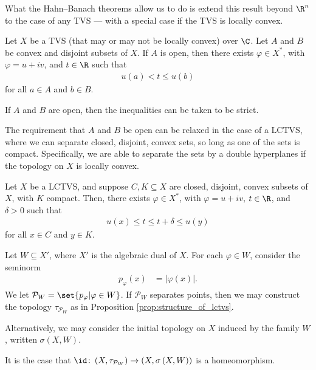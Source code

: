 What the Hahn--Banach theorems allow us to do is extend this result beyond $\R^n$ to the case of any TVS --- with a special case if the TVS is locally convex.
\begin{theorem}\label{thm:hb_separation_tvs}
  Let $X$ be a TVS (that may or may not be locally convex) over $\C$. Let $A$ and $B$ be convex and disjoint subsets of $X$. If $A$ is open, then there exists $\varphi\in X^{\ast}$, with $\varphi = u + iv$, and $t\in \R$ such that
  \begin{align*}
    u(a) < t \leq u(b)
  \end{align*}
  for all $a\in A$ and $b\in B$.\newline

  If $A$ and $B$ are open, then the inequalities can be taken to be strict.
\end{theorem}
The requirement that $A$ and $B$ be open can be relaxed in the case of a LCTVS, where we can separate closed, disjoint, convex sets, so long as one of the sets is compact. Specifically, we are able to separate the sets by a double hyperplanes if the topology on $X$ is locally convex.
\begin{theorem}\label{thm:hb_separation_lctvs}
  Let $X$ be a LCTVS, and suppose $C,K\subseteq X$ are closed, disjoint, convex subsets of $X$, with $K$ compact. Then, there exists $\varphi\in X^{\ast}$, with $\varphi = u + iv$, $t\in \R$, and $\delta > 0$ such that
  \begin{align*}
    u(x) \leq t \leq t + \delta \leq u(y)
  \end{align*}
  for all $x\in C$ and $y\in K$.
\end{theorem}
\begin{proposition}
  Let $W\subseteq X'$, where $X'$ is the algebraic dual of $X$. For each $\varphi\in W$, consider the seminorm
  \begin{align*}
    p_{\varphi}(x) &= \left\vert \varphi(x) \right\vert.
  \end{align*}
  We let $\mathcal{P}_{W} = \set{p_{\varphi} | \varphi\in W}$. If $\mathcal{P}_{W}$ separates points, then we may construct the topology $\tau_{\mathcal{P}_{W}}$ as in Proposition \ref{prop:structure_of_lctvs}.\newline

  Alternatively, we may consider the initial topology on $X$ induced by the family $W$, written $\sigma\left(X,W\right)$.\newline

  It is the case that $\id\colon \left(X,\tau_{\mathcal{P}_{W}}\right)\rightarrow \left(X,\sigma\left(X,W\right)\right)$ is a homeomorphism.
\end{proposition}
